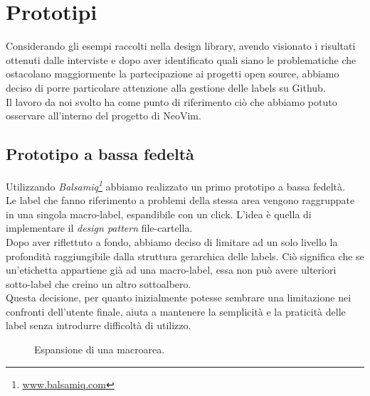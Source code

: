 \documentclass[12pt]{article} %
\begin{document}
\newpage

\section{Prototipi}
Considerando gli esempi raccolti nella design library, avendo visionato i risultati ottenuti dalle interviste e dopo aver identificato quali siano le problematiche che ostacolano maggiormente la partecipazione ai progetti open source, abbiamo deciso di porre particolare attenzione alla gestione delle labels su Github.\\
Il lavoro da noi svolto ha come punto di riferimento ci\`o che abbiamo potuto osservare all'interno del progetto di NeoVim.\\

\subsection{Prototipo a bassa fedelt\`a}
Utilizzando \emph{Balsamiq\footnote{\url{www.balsamiq.com}}} abbiamo realizzato un primo prototipo a bassa fedelt\`a.\\
Le label che fanno riferimento a problemi della stessa area vengono raggruppate in una singola macro-label, espandibile con un click. L'idea \`e quella di implementare il \emph{design pattern} file-cartella.\\
Dopo aver riflettuto a fondo, abbiamo deciso di limitare ad un solo livello la profondit\`a raggiungibile dalla struttura gerarchica delle labels. Ci\`o significa che se un'etichetta appartiene gi\`a ad una macro-label, essa non pu\`o avere ulteriori sotto-label che creino un altro sottoalbero.\\
Questa decisione, per quanto inizialmente potesse sembrare una limitazione nei confronti dell'utente finale, aiuta a mantenere la semplicit\`a e la praticit\`a delle label senza introdurre difficolt\`a di utilizzo.

\begin{figure}[H]
\caption{Espansione di una macroarea.}
\label{fig:low_prototype}
\end{figure}
\end{document}
